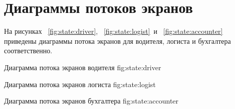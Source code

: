 \chapter{Диаграммы потоков экранов}
\label{chap:states}

На рисунках
~\ref{fig:state:driver},
~\ref{fig:state:logist}~и
~\ref{fig:state:accounter} 
приведены диаграммы потока экранов для 
водителя, логиста и бухгалтера соответственно.

    {Диаграмма потока экранов водителя}
    {fig:state:driver}

    {Диаграмма потока экранов логиста}
    {fig:state:logist}

    {Диаграмма потока экранов бухгалтера}
    {fig:state:accounter}
